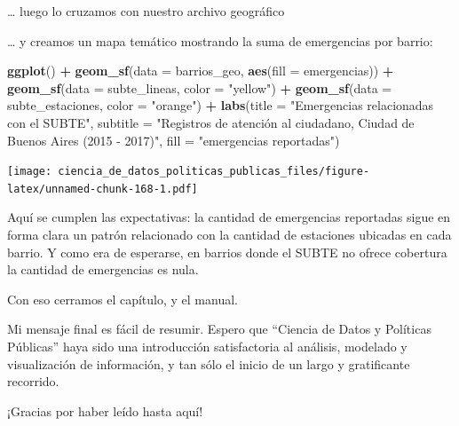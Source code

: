 \documentclass[]{book}
\newenvironment{Shaded}{\begin{snugshade}}{\end{snugshade}}
\newcommand{\KeywordTok}[1]{\textcolor[rgb]{0.13,0.29,0.53}{\textbf{#1}}}
\newcommand{\DataTypeTok}[1]{\textcolor[rgb]{0.13,0.29,0.53}{#1}}
\newcommand{\StringTok}[1]{\textcolor[rgb]{0.31,0.60,0.02}{#1}}
\newcommand{\OperatorTok}[1]{\textcolor[rgb]{0.81,0.36,0.00}{\textbf{#1}}}
\newcommand{\NormalTok}[1]{#1}
\begin{document}
\ldots{} luego lo cruzamos con nuestro archivo geográfico

\begin{Shaded}
\end{Shaded}

\ldots{} y creamos un mapa temático mostrando la suma de emergencias por
barrio:

\begin{Shaded}
\begin{Highlighting}[]
\KeywordTok{ggplot}\NormalTok{() }\OperatorTok{+}
\StringTok{    }\KeywordTok{geom_sf}\NormalTok{(}\DataTypeTok{data =}\NormalTok{ barrios_geo, }\KeywordTok{aes}\NormalTok{(}\DataTypeTok{fill =}\NormalTok{ emergencias)) }\OperatorTok{+}
\StringTok{    }\KeywordTok{geom_sf}\NormalTok{(}\DataTypeTok{data =}\NormalTok{ subte_lineas, }\DataTypeTok{color =} \StringTok{"yellow"}\NormalTok{) }\OperatorTok{+}
\StringTok{    }\KeywordTok{geom_sf}\NormalTok{(}\DataTypeTok{data =}\NormalTok{ subte_estaciones, }\DataTypeTok{color =} \StringTok{"orange"}\NormalTok{) }\OperatorTok{+}
\StringTok{    }\KeywordTok{labs}\NormalTok{(}\DataTypeTok{title =} \StringTok{"Emergencias relacionadas con el SUBTE"}\NormalTok{,}
         \DataTypeTok{subtitle =} \StringTok{"Registros de atención al ciudadano, Ciudad de Buenos Aires (2015 - 2017)"}\NormalTok{,}
         \DataTypeTok{fill =} \StringTok{"emergencias reportadas"}\NormalTok{)}
\end{Highlighting}
\end{Shaded}

\texttt{[image: ciencia\_de\_datos\_politicas\_publicas\_files/figure-latex/unnamed-chunk-168-1.pdf]}

Aquí se cumplen las expectativas: la cantidad de emergencias reportadas
sigue en forma clara un patrón relacionado con la cantidad de estaciones
ubicadas en cada barrio. Y como era de esperarse, en barrios donde el
SUBTE no ofrece cobertura la cantidad de emergencias es nula.

Con eso cerramos el capítulo, y el manual.

Mi mensaje final es fácil de resumir. Espero que ``Ciencia de Datos y
Políticas Públicas'' haya sido una introducción satisfactoria al
análisis, modelado y visualización de información, y tan sólo el inicio
de un largo y gratificante recorrido.

¡Gracias por haber leído hasta aquí!


\end{document}
